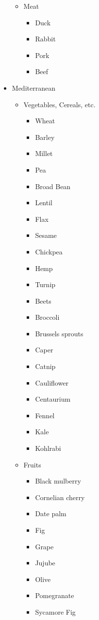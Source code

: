 \documentclass{article}
\begin{document}
\begin{itemize}
\begin{itemize}
\begin{itemize}
			\end{itemize}
		\end{itemize}
		\begin{itemize}
			\item Meat
			\begin{itemize}
				\item Duck
				\item Rabbit
				\item Pork
				\item Beef
			\end{itemize}
		\end{itemize}
	\item Mediterranean
		\begin{itemize}
			\item Vegetables, Cereals, etc.
			\begin{itemize}
				\item Wheat
				\item Barley
				\item Millet
				\item Pea
				\item Broad Bean
				\item Lentil
				\item Flax
				\item Sesame
				\item Chickpea
				\item Hemp
				\item Turnip
				\item Beets
				\item Broccoli
				\item Brussels sprouts
				\item Caper
				\item Catnip
				\item Cauliflower
				\item Centaurium
				\item Fennel
				\item Kale
				\item Kohlrabi
			\end{itemize}
		\end{itemize}
		\begin{itemize}
			\item Fruits
			\begin{itemize}
				\item Black mulberry
				\item Cornelian cherry 
				\item Date palm 
				\item Fig
				\item Grape
				\item Jujube
				\item Olive
				\item Pomegranate
				\item Sycamore Fig
			\end{itemize}
		\end{itemize}
	\end{itemize}
\end{document}
